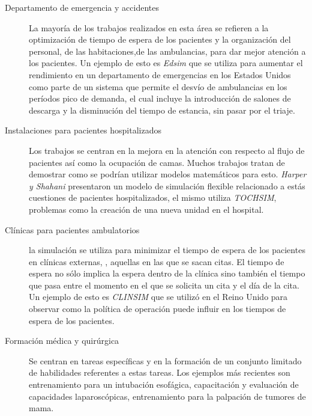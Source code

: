 \begin{description}

\item[Departamento de emergencia y accidentes] La mayoría de los trabajos
	realizados en esta área se refieren a la optimización de tiempo de
	espera de los pacientes y la organización del personal, de las
	habitaciones,de las ambulancias, para dar mejor atención a los
    pacientes. Un ejemplo de esto es \emph{Edsim} que se utiliza para aumentar
    el rendimiento en un departamento de emergencias en los Estados Unidos como
    parte de un sistema que permite el desvío de ambulancias en los períodos
    pico de demanda, el cual incluye la introducción de salones de descarga y la
    disminución del tiempo de estancia, sin pasar por el
    triaje\cite{guna:simulation}. 
	
\item[Instalaciones para pacientes hospitalizados] Los trabajos se centran en la
    mejora en la atención con respecto al flujo de pacientes así como la
    ocupación de camas. Muchos trabajos tratan de demostrar como se podrían
    utilizar modelos matemáticos para esto. \emph{Harper y Shahani} presentaron
    un modelo de simulación flexible relacionado a estás cuestiones de pacientes
    hospitalizados, el mismo utiliza \emph{TOCHSIM},  problemas como la creación de una nueva
    unidad en el hospital\cite{guna:simulation}.

\item[Clínicas para pacientes ambulatorios]  la
    simulación se utiliza para minimizar el tiempo de espera de los pacientes en
    clínicas externas, , aquellas en las que se sacan citas. El tiempo
    de espera no sólo implica la espera dentro de la clínica sino también el
    tiempo que pasa entre el momento en el que se solicita un cita y el día de
    la cita. Un ejemplo de esto es \emph{CLINSIM} que se utilizó en el Reino
    Unido para observar como la política de operación puede influir en los
    tiempos de espera de los pacientes\cite{guna:simulation}. 

\item[Formación médica y quirúrgica] Se centran en tareas específicas y en la
	formación de un conjunto limitado de habilidades referentes a estas
	tareas. Los ejemplos más recientes son entrenamiento para un intubación
	esofágica, capacitación y evaluación de capacidades laparoscópicas,
	entrenamiento para la palpación de tumores de mama\cite{mantovani:vr}. 


\end{description}
